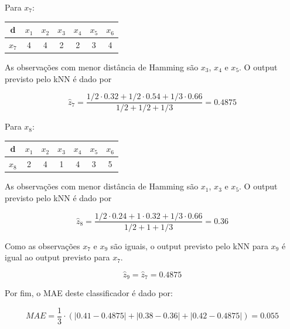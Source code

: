 \documentclass[a4paper,12pt]{article} %
\begin{document}
\begin{enumerate}
Para $x_7$:

\begin{table}[H]
    \centering
    \begin{tabular}{c|cccccc}
    d      & $x_1$ & $x_2$ & $x_3$ & $x_4$ & $x_5$ & $x_6$ \\ \hline
    $x_7$  & 4     & 4     & 2     & 2     & 3     & 4    
    \end{tabular}
\end{table}

As observações com menor distância de Hamming são $x_3$, $x_4$ e $x_5$. O output previsto pelo kNN é dado por 

\begin{equation*}
    \hat{z}_{7} = \frac{1/2 \cdot 0.32 + 1/2 \cdot 0.54 + 1/3 \cdot 0.66}{1/2 + 1/2 + 1/3} = 0.4875
\end{equation*}

Para $x_8$:

\begin{table}[H]
    \centering
    \begin{tabular}{c|cccccc}
    d      & $x_1$ & $x_2$ & $x_3$ & $x_4$ & $x_5$ & $x_6$ \\ \hline
    $x_8$  & 2     & 4     & 1     & 4     & 3     & 5    
    \end{tabular}
    \end{table}

As observações com menor distância de Hamming são $x_1$, $x_3$ e $x_5$. O output previsto pelo kNN é dado por 

\begin{equation*}
    \hat{z}_{8} = \frac{1/2 \cdot 0.24 + 1 \cdot 0.32 + 1/3 \cdot 0.66}{1/2 + 1 + 1/3} = 0.36
\end{equation*}

Como as observações $x_7$ e $x_9$ são iguais, o output previsto pelo kNN para  $x_9$ é igual ao output previsto para $x_7$.

\begin{equation*}
    \hat{z}_{9} = \hat{z}_{7} = 0.4875
\end{equation*}

Por fim, o MAE deste classificador é dado por:

\begin{equation*}
    MAE = \frac{1}{3} \cdot (|0.41 - 0.4875| + |0.38 - 0.36| + |0.42 - 0.4875|) = 0.055
\end{equation*}

\end{enumerate}
\end{document}
